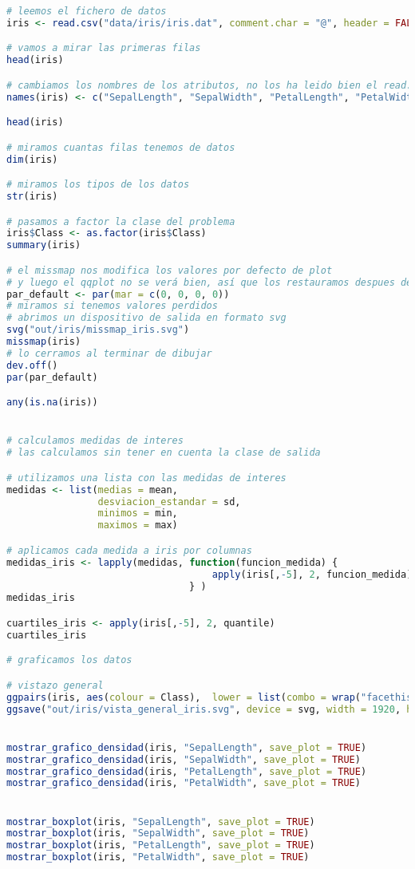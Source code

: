 \begin{lstlisting}[language=R]
# leemos el fichero de datos
iris <- read.csv("data/iris/iris.dat", comment.char = "@", header = FALSE)

# vamos a mirar las primeras filas
head(iris)

# cambiamos los nombres de los atributos, no los ha leido bien el read.csv
names(iris) <- c("SepalLength", "SepalWidth", "PetalLength", "PetalWidth", "Class")

head(iris)

# miramos cuantas filas tenemos de datos
dim(iris)

# miramos los tipos de los datos
str(iris)

# pasamos a factor la clase del problema
iris$Class <- as.factor(iris$Class)
summary(iris)

# el missmap nos modifica los valores por defecto de plot
# y luego el qqplot no se verá bien, así que los restauramos despues del missmap
par_default <- par(mar = c(0, 0, 0, 0))
# miramos si tenemos valores perdidos
# abrimos un dispositivo de salida en formato svg
svg("out/iris/missmap_iris.svg")
missmap(iris)
# lo cerramos al terminar de dibujar
dev.off()
par(par_default)

any(is.na(iris))


# calculamos medidas de interes
# las calculamos sin tener en cuenta la clase de salida

# utilizamos una lista con las medidas de interes
medidas <- list(medias = mean,
				desviacion_estandar = sd,
				minimos = min,
				maximos = max)

# aplicamos cada medida a iris por columnas
medidas_iris <- lapply(medidas, function(funcion_medida) {
									apply(iris[,-5], 2, funcion_medida)
								} )
medidas_iris

cuartiles_iris <- apply(iris[,-5], 2, quantile)
cuartiles_iris

# graficamos los datos

# vistazo general
ggpairs(iris, aes(colour = Class),  lower = list(combo = wrap("facethist", bins = 20))) + theme_minimal()
ggsave("out/iris/vista_general_iris.svg", device = svg, width = 1920, height = 1080, units = "px", dpi = 150)


mostrar_grafico_densidad(iris, "SepalLength", save_plot = TRUE)
mostrar_grafico_densidad(iris, "SepalWidth", save_plot = TRUE)
mostrar_grafico_densidad(iris, "PetalLength", save_plot = TRUE)
mostrar_grafico_densidad(iris, "PetalWidth", save_plot = TRUE)


mostrar_boxplot(iris, "SepalLength", save_plot = TRUE)
mostrar_boxplot(iris, "SepalWidth", save_plot = TRUE)
mostrar_boxplot(iris, "PetalLength", save_plot = TRUE)
mostrar_boxplot(iris, "PetalWidth", save_plot = TRUE)



\end{lstlisting}
